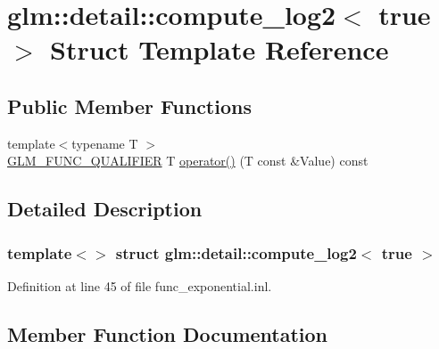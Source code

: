 \hypertarget{structglm_1_1detail_1_1compute__log2_3_01true_01_4}{}\section{glm\+:\+:detail\+:\+:compute\+\_\+log2$<$ true $>$ Struct Template Reference}
\label{structglm_1_1detail_1_1compute__log2_3_01true_01_4}
\subsection*{Public Member Functions}
\begin{DoxyCompactItemize}
\item 
{\footnotesize template$<$typename T $>$ }\\\hyperlink{setup_8hpp_a33fdea6f91c5f834105f7415e2a64407}{G\+L\+M\+\_\+\+F\+U\+N\+C\+\_\+\+Q\+U\+A\+L\+I\+F\+I\+ER} T \hyperlink{structglm_1_1detail_1_1compute__log2_3_01true_01_4_a653d1eeb9118ba40653dd8878b67702f}{operator()} (T const \&Value) const
\end{DoxyCompactItemize}


\subsection{Detailed Description}
\subsubsection*{template$<$$>$\newline
struct glm\+::detail\+::compute\+\_\+log2$<$ true $>$}



Definition at line 45 of file func\+\_\+exponential.\+inl.



\subsection{Member Function Documentation}
\mbox{\label{structglm_1_1detail_1_1compute__log2_3_01true_01_4_a653d1eeb9118ba40653dd8878b67702f}} 
